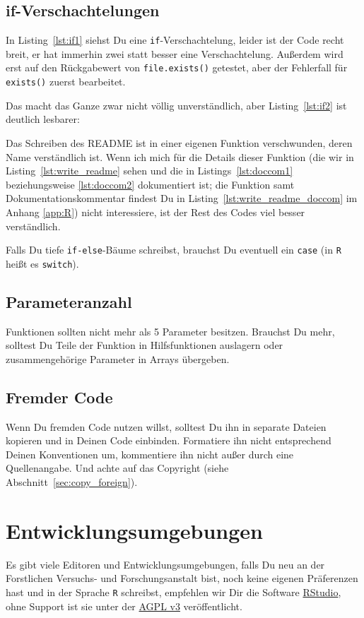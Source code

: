 \documentclass[twoside]{scrreprt}
\providecommand{\R}{\texttt{R}}
\providecommand{\code}[1]{\texttt{#1}}
\providecommand{\FVA}[1]{Forstliche#1 Versuchs- und Forschungsanstalt}
\begin{document}
\subsection{if-Verschachtelungen\label{sec:if}}
In Listing~\ref{lst:if1} siehst Du eine \code{if}-Verschachtelung, leider ist
der Code recht breit, er hat immerhin zwei statt besser eine Verschachtelung.
Au\ss{}erdem wird erst auf den R\"u{}ckgabewert von
\code{file.exists()} getestet, aber der Fehlerfall f\"u{}r
\code{exists()} zuerst bearbeitet.

Das macht das Ganze zwar nicht v\"o{}llig unverst\"a{}ndlich, aber
Listing~\ref{lst:if2} ist deutlich lesbarer:

Das Schreiben des README ist in
einer eigenen Funktion verschwunden, deren Name verst\"a{}ndlich ist. Wenn ich
mich f\"u{}r die Details dieser Funktion
(die wir in Listing~\ref{lst:write_readme} sehen und die in
Listings~\ref{lst:doccom1} beziehungsweise \ref{lst:doccom2} dokumentiert ist;
die Funktion samt Dokumentationskommentar findest Du in
Listing~\ref{lst:write_readme_doccom}
im Anhang \ref{app:R})
nicht interessiere, ist der Rest des Codes viel besser verst\"a{}ndlich.


Falls Du tiefe \code{if-else}-B\"a{}ume schreibst, brauchst Du eventuell
ein \code{case} (in \R{} hei\ss{}t es \code{switch}).
\subsection{Parameteranzahl\label{sec:parameteranzahl}}
Funktionen sollten nicht mehr als 5 Parameter besitzen.
Brauchst Du mehr, solltest Du Teile der Funktion in Hilfsfunktionen auslagern
oder zusammengeh\"o{}rige Parameter in Arrays \"u{}bergeben.

\subsection{Fremder Code}
Wenn Du fremden Code nutzen willst, solltest Du ihn in separate Dateien kopieren
und in Deinen Code einbinden.
Formatiere ihn nicht entsprechend Deinen Konventionen um,
kommentiere ihn nicht au\ss{}er durch eine Quellenangabe.
Und achte auf das Copyright (siehe Abschnitt~\ref{sec:copy_foreign}).

\section{Entwicklungsumgebungen}
Es gibt viele Editoren und Entwicklungsumgebungen, falls Du neu an der
\FVA{n} bist, noch keine
eigenen Pr\"a{}ferenzen hast und in der Sprache \R{} schreibst, empfehlen wir
Dir die Software \href{http://www.rstudio.com/products/rstudio/}{RStudio},
ohne Support ist sie unter der 
\href{https://www.gnu.org/licenses/agpl-3.0.html}{AGPL v3} ver\"o{}ffentlicht.
\end{document}
